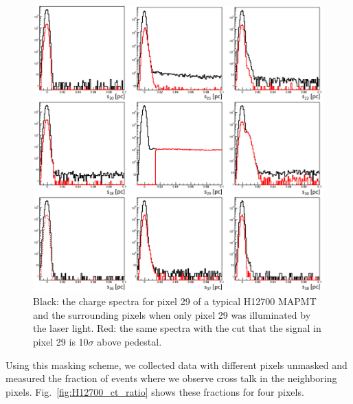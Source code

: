 \begin{figure}
	\centering
	\includegraphics[width=\linewidth]{figures/H12700_3mm_mask_config5_ct.png}
	\caption{Black: the charge spectra for pixel 29 of a typical H12700 MAPMT and the surrounding pixels when only pixel 29 was illuminated by the laser light. Red: the same spectra with the cut that the signal in pixel 29 is 10$\sigma$ above pedestal.}
	\label{fig:H12700pinhole}
\end{figure}

Using this masking scheme, we collected data with different pixels unmasked and measured the fraction of events where we observe cross talk in the neighboring pixels. Fig.~\ref{fig:H12700_ct_ratio} shows these fractions for four pixels. 


